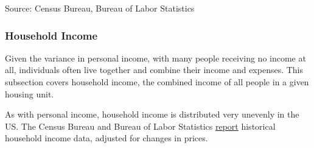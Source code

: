 \documentclass{report}
\newcommand{\tbllink}[1]{\href{https://raw.githubusercontent.com/bdecon/US-chartbook/master/chartbook/data/#1}{\faTable}}
\begin{document}
{\begin{minipage}{0.76\textwidth}
\footnotesize{Source: Census Bureau, Bureau of Labor Statistics}  \hfill \tbllink{pinc_ch_contrib.csv}
\end{minipage}
\newpage
\begin{minipage}{0.76\textwidth}  
\subsubsection*{Household Income}
\small Given the variance in personal income, with many people receiving no income at all, individuals often live together and combine their income and expenses. This subsection covers household income, the combined income of all people in a given housing unit. 

As with personal income, household income is distributed very unevenly in the US. The Census Bureau and Bureau of Labor Statistics \href{https://www.census.gov/data/tables/time-series/demo/income-poverty/cps-hinc.html}{report} historical household income data, adjusted for changes in prices. 
\end{minipage}

}
\end{document}
